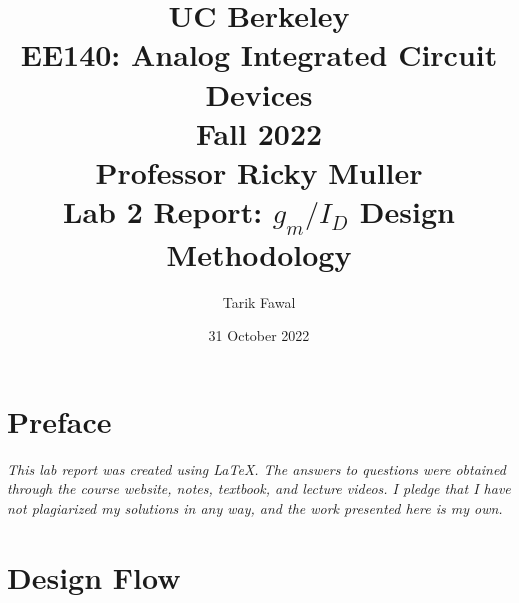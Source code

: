 \documentclass[12pt, fleqn]{article}
\title {
    \normalsize{UC Berkeley}\\
    \large{{EE140: Analog Integrated Circuit Devices\\Fall 2022\\Professor Ricky Muller\\}}
    \vspace{0.5ex}
    \Huge{Lab 2 Report: $g_m / I_D$ Design Methodology}
    \vspace{0.5ex}
}
\author{Tarik Fawal}
\date{31 October 2022}
\begin{document}
\maketitle
\tableofcontents
\flushbottom
    \section*{Preface}
        \textit{\emph{This lab report was created using \LaTeX.  The answers to questions were obtained through the course website, notes, textbook, and lecture videos.  I pledge that I have not plagiarized my solutions in any way, and the work presented here is my own.}}
\newpage
\section{Design Flow}
\end{document}
